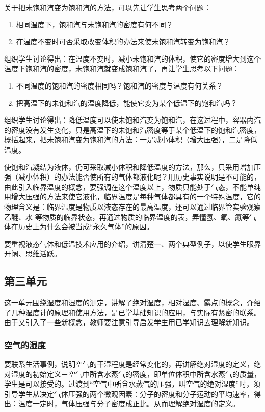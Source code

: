 关于把未饱和汽变为饱和汽的方法，可以先让学生思考两个问题：
\begin{enumerate}
    \item 相同温度下，饱和汽与未饱和汽的密度有何不同？
    \item 在温度不变时可否采取改变体积的办法来使未饱和汽转变为饱和汽？
\end{enumerate}
组织学生讨论得出：在温度不变时，减小未饱和汽的体积，使它的密度增大到这个温度下饱和汽的密度，未饱和汽就变成饱和汽了，再让学生思考以下问题：
\begin{enumerate}
\item 不同温度的饱和汽的密度相同吗？饱和汽的密度与温度有何关系？    \item 把高温下的未饱和汽的温度降低，能使它变为某个低温下的饱和汽吗？
\end{enumerate}
组织学生讨论得出：降低温度可以使未饱和汽变为饱和汽，在这过程中，容器内汽的密度没有发生变化，只是高温下的未饱和汽密度等于某个低温下的饱和汽密度，概括起来，把未饱和汽变为饱和汽的方法：一是减小体积（增大压强），二是降低温度。

使饱和汽凝结为液体，仍可采取减小体积和降低温度的方法，那么，只采用增加压强（减小体积）的办法能否使所有的气体都液化呢？用历史事实说明是不可能的，由此引入临界温度的概念，要强调在这个温度以上，物质只能处于气态，不能单纯用增大压强的方法来使它液化，临界温度是每种气体都具有的一个特殊温度，它的物理含义是：临界温度是物质以液态存在的最高温度，还可以通过临界管实验观察乙醚、水
等物质的临界状态，再通过物质的临界温度的表，弄懂氢、氧、氮等气体在历史上为什么会被当成“永久气体”的原因。

要重视液态气体和低温技术应用的介绍，讲清楚一、两个典型例子，以使学生眼界开阔、思维活跃。

\subsection{第三单元}
这一单元围绕湿度和湿度的测定，讲解了绝对湿度，相对湿度、露点的概念，介绍了几种湿度计的原理和使用方法，是已学基础知识的应用，与实际有紧密的联系。由于又引入了一些新概念，教师要注意引导启发学生用已学知识去理解新知识。

\subsubsection{空气的湿度}

要联系生活事例，说明空气的干湿程度是经常变化的，再讲解绝对湿度的定义，绝对湿度的初始定义－空气中所含水蒸气的密度，即单位体积中所含水蒸气的质量，学生是可以接受的。过渡到“空气中所含水蒸气的压强，叫空气的绝对湿度”时，须引导学生从决定气体压强的两个微观因素：分子的密度和分子运动的平均速率，得出：温度一定时，气体压强与分子密度成正比。从而理解绝对湿度的定义。


